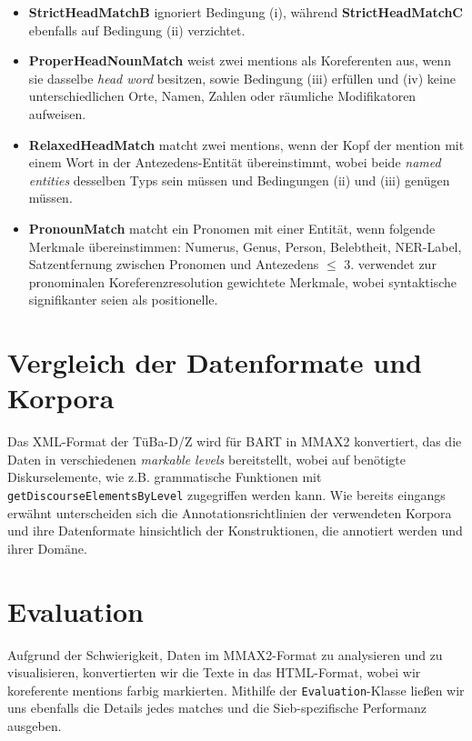 \documentclass{scrartcl}
\begin{document}
\begin{itemize}
\item \textbf{StrictHeadMatchB} ignoriert Bedingung (i), während \textbf{StrictHeadMatchC} ebenfalls auf Bedingung (ii) verzichtet.

\item \textbf{ProperHeadNounMatch} weist zwei mentions als Koreferenten aus, wenn sie dasselbe \textit{head word} besitzen, sowie Bedingung (iii) erfüllen und (iv) keine unterschiedlichen Orte, Namen, Zahlen oder räumliche Modifikatoren aufweisen.

\item \textbf{RelaxedHeadMatch} matcht zwei mentions, wenn der Kopf der mention mit einem Wort in der Antezedens-Entität übereinstimmt, wobei beide \textit{named entities} desselben Typs sein müssen und Bedingungen (ii) und (iii) genügen müssen.

\item \textbf{PronounMatch} matcht ein Pronomen mit einer Entität, wenn folgende Merkmale übereinstimmen: Numerus, Genus, Person, Belebtheit, NER-Label, Satzentfernung zwischen Pronomen und Antezedens ${\leq}$ 3.  verwendet zur pronominalen Koreferenzresolution gewichtete Merkmale, wobei syntaktische signifikanter seien als positionelle.

\end{itemize}

\section{Vergleich der Datenformate und Korpora}
Das XML-Format der TüBa-D/Z wird für BART in MMAX2 \cite{muller2006} konvertiert, das die Daten in verschiedenen \textit{markable levels} bereitstellt, wobei auf benötigte Diskurselemente, wie z.B. grammatische Funktionen mit \texttt{getDiscourseElementsByLevel} zugegriffen werden kann. Wie bereits eingangs erwähnt unterscheiden sich die Annotationsrichtlinien der verwendeten Korpora und ihre Datenformate hinsichtlich der Konstruktionen, die annotiert werden und ihrer Domäne.

\section{Evaluation}
Aufgrund der Schwierigkeit, Daten im MMAX2-Format zu analysieren und zu visualisieren, konvertierten wir die Texte in das HTML-Format, wobei wir koreferente mentions farbig markierten. Mithilfe der \texttt{Evaluation}-Klasse ließen wir uns ebenfalls die Details jedes matches und die Sieb-spezifische Performanz ausgeben.
\end{document}
